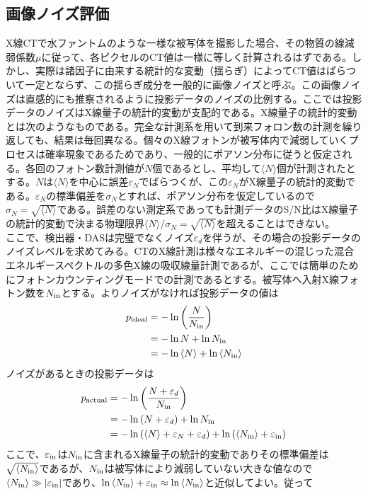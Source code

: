 \subsection{画像ノイズ評価\label{sec:noise}}
X線CTで水ファントムのような一様な被写体を撮影した場合、その物質の線減弱係数$\mu$に従って、各ピクセルのCT値は一様に等しく計算されるはずである。しかし、実際は諸因子に由来する統計的な変動（揺らぎ）によってCT値はばらついて一定とならず、この揺らぎ成分を一般的に画像ノイズと呼ぶ。この画像ノイズは直感的にも推察されるように投影データのノイズの比例する。ここでは投影データのノイズはX線量子の統計的変動が支配的である。X線量子の統計的変動とは次のようなものである。完全な計測系を用いて到来フォロン数の計測を繰り返しても、結果は毎回異なる。個々のX線フォトンが被写体内で減弱していくプロセスは確率現象であるためであり、一般的にポアソン分布に従うと仮定される。各回のフォトン数計測値が$N$個であるとし、平均して$\langle N \rangle$個が計測されたとする。$N$は$\langle N \rangle$を中心に誤差$\varepsilon_N$でばらつくが、この$\varepsilon_N$がX線量子の統計的変動である。$\varepsilon_N$の標準偏差を$\sigma_N$とすれば、ポアソン分布を仮定しているので$\sigma_N=\sqrt{\langle N \rangle}$である。誤差のない測定系であっても計測データのS/N比はX線量子の統計的変動で決まる物理限界$\langle N \rangle/\sigma_N=\sqrt{\langle N \rangle}$を超えることはできない。\\
ここで、検出器・DASは完璧でなくノイズ$\varepsilon_d$を伴うが、その場合の投影データのノイズレベルを求めてみる。CTのX線計測は様々なエネルギーの混じった混合エネルギースペクトルの多色X線の吸収線量計測であるが、ここでは簡単のためにフォトンカウンティングモードでの計測であるとする。被写体へ入射X線フォトン数を$N_{\rm in}$とする。よりノイズがなければ投影データの値は
\begin{align}
p_{\rm ideal}&=-\ln{\left(\frac{N}{N_{\rm in}}\right)}\\
&=-\ln{N}+\ln{N_{\rm in}}\\
&=-\ln{\langle N \rangle}+\ln{\langle N_{\rm in} \rangle}
\end{align}
ノイズがあるときの投影データは
\begin{align}
p_{\rm actual}&=-\ln{\left( \frac{N+\varepsilon_d}{N_{\rm in}}   \right)}\\
&=-\ln{(N+\varepsilon_d)}+\ln{N_{\rm in}}\\
&=-\ln{(\langle N \rangle + \varepsilon_N + \varepsilon_d)}+\ln{(\langle N_{\rm in} \rangle + \varepsilon_{\rm in})}
\end{align}
ここで、$\varepsilon_{\rm in}$は$N_{\rm in}$に含まれるX線量子の統計的変動でありその標準偏差は$\sqrt{\langle N_{\rm in} \rangle}$であるが、$N_{\rm in}$は被写体により減弱していない大きな値なので$\langle N_{\rm in} \rangle\gg|\varepsilon_{\rm in}|$であり、$\ln{\langle N_{\rm in} \rangle + \varepsilon_{\rm in}}\approx\ln{\langle N_{\rm in} \rangle}$と近似してよい。従って
